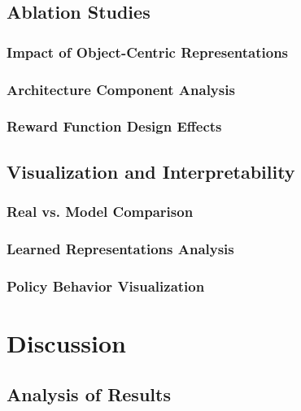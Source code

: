 \documentclass[
	english,
	ruledheaders=section,
	class=report,
	thesis={type=master},
	accentcolor=9c,
	custommargins=true,
	marginpar=false,
	parskip=half-,
	fontsize=11pt,
]{tudapub}
\begin{document}
\section{Ablation Studies}
\label{sec:ablation_studies}

\subsection{Impact of Object-Centric Representations}
\label{subsec:oc_impact}

\subsection{Architecture Component Analysis}
\label{subsec:architecture_analysis}

\subsection{Reward Function Design Effects}
\label{subsec:reward_effects}

\section{Visualization and Interpretability}
\label{sec:visualization}

\subsection{Real vs. Model Comparison}
\label{subsec:real_vs_model}

\subsection{Learned Representations Analysis}
\label{subsec:representation_analysis}

\subsection{Policy Behavior Visualization}
\label{subsec:policy_visualization}

\chapter{Discussion}
\label{chap:discussion}

\section{Analysis of Results}
\label{sec:results_analysis}
\end{document}
